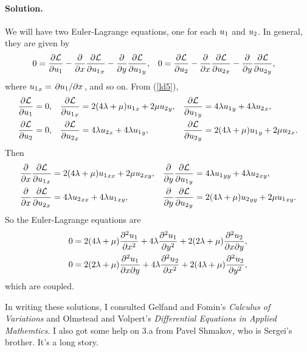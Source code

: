 \documentclass[11pt]{article}
\newcommand{\refeq}[1]{(\ref{#1})}
\newenvironment{solution}
{
    \paragraph{Solution.}
    \ignorespaces
}
{
}
\begin{document}
\begin{solution}
	We will have two Euler-Lagrange equations, one for each $u_1$ and $u_2$.  In general, they are given by
	\begin{align*}
		0 &= \pdv{\mathcal{L}}{u_1} - \pdv{}{x} \pdv{\mathcal{L}}{{u_1}_x} - \pdv{}{y} \pdv{\mathcal{L}}{{u_1}_y}, &
		0 &= \pdv{\mathcal{L}}{u_2} - \pdv{}{x} \pdv{\mathcal{L}}{{u_2}_x} - \pdv{}{y} \pdv{\mathcal{L}}{{u_2}_y},
	\end{align*}
	where ${u_1}_x = \pdv*{u_1}{x}$, and so on.  From \refeq{ld5},
	\begin{align*}
		\pdv{\mathcal{L}}{u_1} &= 0, &
		\pdv{\mathcal{L}}{{u_1}_x} &= 2 (4 \lambda + \mu) {u_1}_x + 2 \mu {u_2}_y, &
		\pdv{\mathcal{L}}{{u_1}_y} &= 4 \lambda {u_1}_y + 4 \lambda {u_2}_x, \\
		\pdv{\mathcal{L}}{u_2} &= 0, &
		\pdv{\mathcal{L}}{{u_2}_x} &= 4 \lambda {u_2}_x + 4 \lambda {u_1}_y, &
		\pdv{\mathcal{L}}{{u_2}_y} &= 2 (4 \lambda + \mu) {u_1}_y + 2 \mu {u_2}_x.
	\end{align*}
	Then
	\begin{align*}
		\pdv{}{x} \pdv{\mathcal{L}}{{u_1}_x} &= 2 (4 \lambda + \mu) {u_1}_{xx} + 2 \mu {u_2}_{xy}, &
		\pdv{}{y} \pdv{\mathcal{L}}{{u_1}_y} &= 4 \lambda {u_1}_{yy} + 4 \lambda {u_2}_{xy}, \\
		\pdv{}{x} \pdv{\mathcal{L}}{{u_2}_x} &= 4 \lambda {u_2}_{xx} + 4 \lambda {u_1}_{xy}, &
		\pdv{}{y} \pdv{\mathcal{L}}{{u_2}_y} &= 2 (4 \lambda + \mu) {u_2}_{yy} + 2 \mu {u_1}_{xy}.
	\end{align*}
	So the Euler-Lagrange equations are
	\begin{align*}
		0 &= 2 (4 \lambda + \mu) \pdv[2]{u_1}{x} + 4 \lambda \pdv[2]{u_1}{y} + 2 (2\lambda + \mu) \pdv{u_2}{x}{y}, \\
		0 &= 2 (2 \lambda + \mu) \pdv{u_1}{x}{y} + 4 \lambda \pdv[2]{u_2}{x} + 2 (4 \lambda + \mu) \pdv[2]{u_2}{y},
	\end{align*}
	which are coupled.
\end{solution}



In writing these solutions, I consulted Gelfand and Fomin's \emph{Calculus of Variations} and Olmstead and Volpert's \emph{Differential Equations in Applied Mathemtics}.  I also got some help on 3.a from Pavel Shmakov, who is Sergei's brother.  It's a long story.
\end{document}
